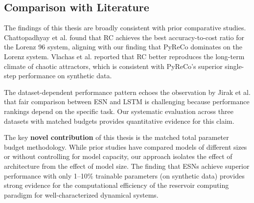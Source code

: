 \subsection{Comparison with Literature}
\label{sec:literature_comparison}

The findings of this thesis are broadly consistent with prior comparative studies. Chattopadhyay et al. \cite{chattopadhyay2020data} found that RC achieves the best accuracy-to-cost ratio for the Lorenz 96 system, aligning with our finding that PyReCo dominates on the Lorenz system. Vlachas et al. \cite{vlachas2020backpropagation} reported that RC better reproduces the long-term climate of chaotic attractors, which is consistent with PyReCo's superior single-step performance on synthetic data.

The dataset-dependent performance pattern echoes the observation by Jirak et al. \cite{jirak2023echo} that fair comparison between ESN and LSTM is challenging because performance rankings depend on the specific task. Our systematic evaluation across three datasets with matched budgets provides quantitative evidence for this claim.

The key \textbf{novel contribution} of this thesis is the matched total parameter budget methodology. While prior studies have compared models of different sizes or without controlling for model capacity, our approach isolates the effect of architecture from the effect of model size. The finding that ESNs achieve superior performance with only 1--10\% trainable parameters (on synthetic data) provides strong evidence for the computational efficiency of the reservoir computing paradigm for well-characterized dynamical systems.
